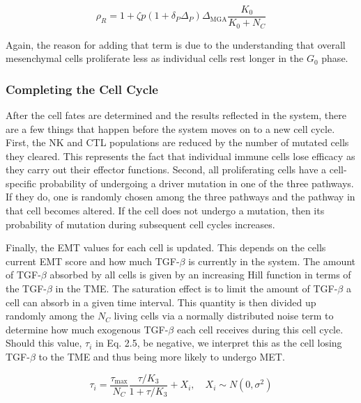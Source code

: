 \documentclass[11pt, a4paper, preprint]{article}
\begin{document}
\begin{equation}\tag{2.4}
\rho_R = 1 + \zeta p(1+\delta_P\Delta_P)\Delta_{\text{MGA}}\frac{K_0}{K_0+N_C}
\end{equation}

Again, the reason for adding that term is due to the understanding that overall mesenchymal cells proliferate less as individual cells rest longer in the $G_0$ phase.

\subsubsection{Completing the Cell Cycle}
After the cell fates are determined and the results reflected in the system, there are a few things that happen before the system moves on to a new cell cycle.
First, the NK and CTL populations are reduced by the number of mutated cells they cleared.
This represents the fact that individual immune cells lose efficacy as they carry out their effector functions. 
Second, all proliferating cells have a cell-specific probability of undergoing a driver mutation in one of the three pathways.
If they do, one is randomly chosen among the three pathways and the pathway in that cell becomes altered.
If the cell does not undergo a mutation, then its probability of mutation during subsequent cell cycles increases.
\par
Finally, the EMT values for each cell is updated.
This depends on the cells current EMT score and how much TGF-$\beta$ is currently in the system.
The amount of TGF-$\beta$ absorbed by all cells is given by an increasing Hill function in terms of the TGF-$\beta$ in the TME.
The saturation effect is to limit the amount of TGF-$\beta$ a cell can absorb in a given time interval.
This quantity is then divided up randomly among the $N_C$ living cells via a normally distributed noise term to determine how much exogenous TGF-$\beta$ each cell receives during this cell cycle.
Should this value, $\tau_i$ in Eq. 2.5, be negative, we interpret this as the cell losing TGF-$\beta$ to the TME and thus being more likely to undergo MET.	

\begin{equation}\tag{2.5}
\tau_i = \frac{\tau_{\text{max}}}{N_C}\frac{\tau/K_3}{1+\tau/K_3} + X_i
, \quad X_i \sim N(0,\sigma^2)
\end{equation}
\end{document}
